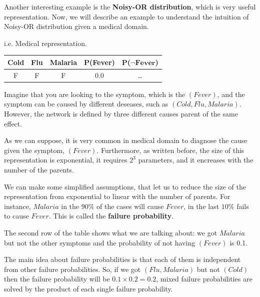 Another interesting example is the \textbf{Noisy-OR distribution}, which is very useful representation. Now, we will describe an example to understand the intuition
of Noisy-OR distribution given a medical domain.
\begin{example}
    i.e. Medical representation. \vspace{7pt}

    \begin{center}
        \begin{tabular}{|c|c|c|c|c|}
            \hline
            \bf Cold & \bf Flu & \bf Malaria & \bf P(Fever) & \bf P($\mathbf{\neg Fever}$) \\
            \hline
            F & F & F & 0.0 & \dots \\
            \hline
        \end{tabular}
    \end{center} \vspace{7pt}

    Imagine that you are looking to the symptom, which is the $(Fever)$, and the symptom can be caused by different deseases, such as $(Cold, Flu, Malaria)$.
    However, the network is defined by three different causes parent of the same effect. \vspace{3.5pt}
    
    As we can suppose, it is very common in medical domain to diagnose the cause given the symptom, $(Fever)$. Furthermore, as written before,
    the size of this representation is exponential, it requires $2^3$ parameters, and it encreases with the number of the parents. \vspace{3.5pt}

    We can make some simplified assumptions, that let us to reduce the size of the representation from exponential to linear with the number of parents. For instance,
    $Malaria$ in the $90\%$ of the cases will cause $Fever$, in the last $10\%$ fails to cause $Fever$. This is called the \textbf{failure probability}. \vspace{3.5pt}

    The second row of the table shows what we are talking about: we got $Malaria$ but not the other symptoms and the probability of not having $(Fever)$ is 0.1. \vspace{3.5pt}

    The main idea about failure probabilities is that each of them is independent from other failure probabilities. So, if we got $(Flu, Malaria)$ but not $(Cold)$ then the 
    failure probability will be $0.1 \times 0.2=0.2$, mixed failure probabilities are solved by the product of each single failure probability.
\end{example}
